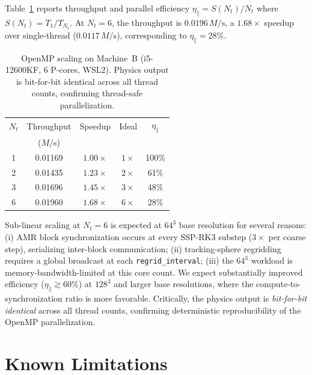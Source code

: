 \documentclass[aps,prd,twocolumn,superscriptaddress,nofootinbib,showpacs,
               longbibliography]{revtex4-2}
\newcommand{\code}[1]{\texttt{#1}}
\begin{document}
Table~\ref{tab:scaling} reports throughput and parallel efficiency
$\eta_\parallel = S(N_t)/N_t$ where $S(N_t) = T_1/T_{N_t}$.
At $N_t = 6$, the throughput is $0.0196\,M/\text{s}$, a $1.68\times$
speedup over single-thread ($0.0117\,M/\text{s}$), corresponding to
$\eta_\parallel = 28\%$.

\begin{table}[t]
\caption{OpenMP scaling on Machine~B (i5-12600KF, 6 P-cores, WSL2).
  Physics output is bit-for-bit identical across all thread counts,
  confirming thread-safe parallelization.}
\label{tab:scaling}
\begin{ruledtabular}
\begin{tabular}{ccccc}
  $N_t$ & Throughput & Speedup & Ideal & $\eta_\parallel$ \\
        & ($M$/s) & & & \\ \hline
  1 & 0.01169 & $1.00\times$ & $1\times$ & 100\% \\
  2 & 0.01435 & $1.23\times$ & $2\times$ & 61\% \\
  3 & 0.01696 & $1.45\times$ & $3\times$ & 48\% \\
  6 & 0.01960 & $1.68\times$ & $6\times$ & 28\% \\
\end{tabular}
\end{ruledtabular}
\end{table}

Sub-linear scaling at $N_t = 6$ is expected at $64^3$ base resolution for
several reasons:
(i) AMR block synchronization occurs at every SSP-RK3 substep ($3\times$
per coarse step), serializing inter-block communication;
(ii) tracking-sphere regridding requires a global broadcast at each
\code{regrid\_interval};
(iii) the $64^3$ workload is memory-bandwidth-limited at this core count.
We expect substantially improved efficiency ($\eta_\parallel \gtrsim 60\%$)
at $128^3$ and larger base resolutions, where the compute-to-synchronization
ratio is more favorable.
Critically, the physics output is \emph{bit-for-bit identical} across all
thread counts, confirming deterministic reproducibility of the OpenMP
parallelization.

\section{Known Limitations}
\label{sec:limitations}
\end{document}
